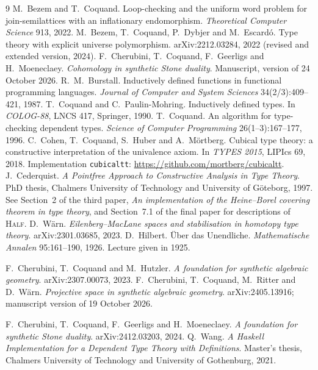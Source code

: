 \documentclass[11pt]{article}
\theoremstyle{remark}
\begin{document}
\begin{thebibliography}{9}
 M.~Bezem and T.~Coquand. Loop-checking and the uniform word
  problem for join-semilattices with an inflationary endomorphism.
  \emph{Theoretical Computer Science} 913, 2022.
 M.~Bezem, T.~Coquand, P.~Dybjer and M.~Escard\'o. Type theory
  with explicit universe polymorphism. arXiv:2212.03284, 2022 (revised and
  extended version, 2024).
 F.~Cherubini, T.~Coquand, F.~Geerligs and H.~Moeneclaey.
  \emph{Cohomology in synthetic Stone duality}. Manuscript, version of
  24 October 2026.
 R.~M.~Burstall. Inductively defined functions in functional
  programming languages. \emph{Journal of Computer and System Sciences}
  34(2/3):409--421, 1987.
 T.~Coquand and C.~Paulin-Mohring. Inductively defined
  types. In \emph{COLOG-88}, LNCS 417, Springer, 1990.
 T.~Coquand. An algorithm for type-checking dependent types.
  \emph{Science of Computer Programming} 26(1--3):167--177, 1996.
 C.~Cohen, T.~Coquand, S.~Huber and A.~M\"ortberg.
  Cubical type theory: a constructive interpretation of the univalence
  axiom. In \emph{TYPES 2015}, LIPIcs 69, 2018. Implementation
  \texttt{cubicaltt}: \url{https://github.com/mortberg/cubicaltt}.
 J.~Cederquist. \emph{A Pointfree Approach to Constructive
  Analysis in Type Theory}. PhD thesis, Chalmers University of Technology and
  University of G\"oteborg, 1997. See Section~2 of the third paper,
  \emph{An implementation of the Heine--Borel covering theorem in type
  theory}, and Section~7.1 of the final paper for descriptions of
  \textsc{Half}.
 D.~W\"arn. \emph{Eilenberg--MacLane spaces and stabilisation
  in homotopy type theory}. arXiv:2301.03685, 2023.
 D.~Hilbert. \"Uber das Unendliche. \emph{Mathematische Annalen}
  95:161--190, 1926. Lecture given in 1925.

 F.~Cherubini, T.~Coquand and M.~Hutzler.
  \emph{A foundation for synthetic algebraic geometry}.
  arXiv:2307.00073, 2023.
 F.~Cherubini, T.~Coquand, M.~Ritter and D.~W\"arn.
  \emph{Projective space in synthetic algebraic geometry}.
  arXiv:2405.13916; manuscript version of 19 October 2026.

 F.~Cherubini, T.~Coquand, F.~Geerligs and H.~Moeneclaey.
  \emph{A foundation for synthetic Stone duality}. arXiv:2412.03203, 2024.
 Q.~Wang. \emph{A Haskell Implementation for a Dependent Type
  Theory with Definitions}. Master's thesis, Chalmers University of Technology
  and University of Gothenburg, 2021.
\end{thebibliography}
\end{document}
